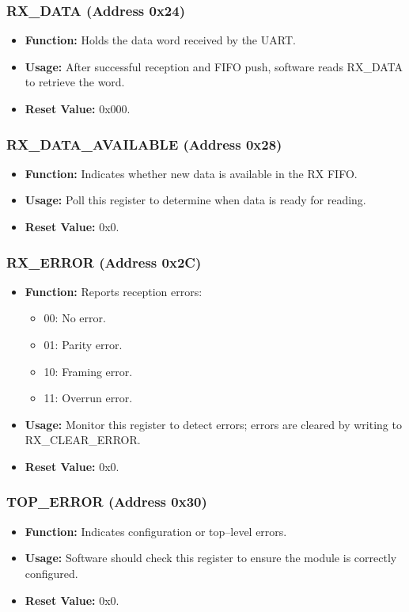 \subsubsection{RX\_DATA (Address 0x24)}
\begin{itemize}[noitemsep]
    \item \textbf{Function:} Holds the data word received by the UART.
    \item \textbf{Usage:} After successful reception and FIFO push, software reads RX\_DATA to retrieve the word.
    \item \textbf{Reset Value:} 0x000.
\end{itemize}

\subsubsection{RX\_DATA\_AVAILABLE (Address 0x28)}
\begin{itemize}[noitemsep]
    \item \textbf{Function:} Indicates whether new data is available in the RX FIFO.
    \item \textbf{Usage:} Poll this register to determine when data is ready for reading.
    \item \textbf{Reset Value:} 0x0.
\end{itemize}

\subsubsection{RX\_ERROR (Address 0x2C)}
\begin{itemize}[noitemsep]
    \item \textbf{Function:} Reports reception errors:
    \begin{itemize}
        \item 00: No error.
        \item 01: Parity error.
        \item 10: Framing error.
        \item 11: Overrun error.
    \end{itemize}
    \item \textbf{Usage:} Monitor this register to detect errors; errors are cleared by writing to RX\_CLEAR\_ERROR.
    \item \textbf{Reset Value:} 0x0.
\end{itemize}

\subsubsection{TOP\_ERROR (Address 0x30)}
\begin{itemize}[noitemsep]
    \item \textbf{Function:} Indicates configuration or top–level errors.
    \item \textbf{Usage:} Software should check this register to ensure the module is correctly configured.
    \item \textbf{Reset Value:} 0x0.
\end{itemize}

